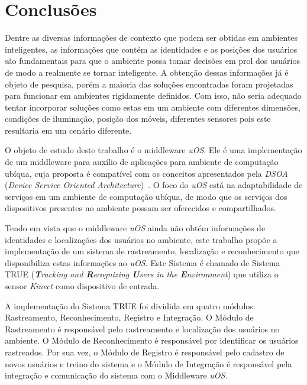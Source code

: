 \chapter{Conclusões}
\label{cap:conclusao}




Dentre as diversas informações de contexto que podem ser obtidas em ambientes
inteligentes, as informações que contém as identidades e as posições dos
usuários são fundamentais para que o ambiente possa tomar decisões em prol dos
usuários de modo a realmente se tornar inteligente. A obtenção dessas
informações já é objeto de pesquisa, porém a maioria das soluções encontradas
foram projetadas para funcionar em ambientes rigidamente definidos. Com isso,
não seria adequado tentar incorporar soluções como estas em um ambiente com
diferentes dimensões, condições de iluminação, posição dos móveis, diferentes
sensores pois este resultaria em um cenário diferente.

O objeto de estudo deste trabalho é o middleware \textit{uOS}. Ele é uma
implementação de um middleware para auxílio de aplicações para ambiente de
computação ubíqua, cuja proposta é compatível com os conceitos apresentados
pela \textit{DSOA} (\textit{Device Service Oriented
Architecture})~\cite{fabriciobuzzeto}. O foco do \textit{uOS} está na
adaptabilidade de serviços em um ambiente de computação ubíqua, de modo que os
serviços dos dispositivos presentes no ambiente possam ser oferecidos e
compartilhados.

Tendo em vista que o middleware \textit{uOS} ainda não obtém informações de identidades e localizações dos usuários no ambiente, este
trabalho propõe a implementação de um sistema de rastreamento, localização e reconhecimento que disponibiliza estas informações ao \textit{uOS}. Este Sistema é chamado de Sistema TRUE (\textit{\textbf{T}racking and \textbf{R}ecognizing \textbf{U}sers in the \textbf{E}nvironment}) que utiliza o sensor \textit{Kinect} como dispositivo de entrada. 

A implementação do Sistema TRUE foi dividida em  quatro módulos: Rastreamento, Reconhecimento, Registro e Integração. O Módulo de Rastreamento é responsável pelo rastreamento e localização dos usuários no ambiente. O Módulo de Reconhecimento é responsável por identificar os usuários rastreados. Por sua vez, o Módulo de Registro é responsável pelo cadastro de novos usuários e treino do sistema e o Módulo de Integração é responsável pela integração e comunicação do sistema com o Middleware \textit{uOS}.

